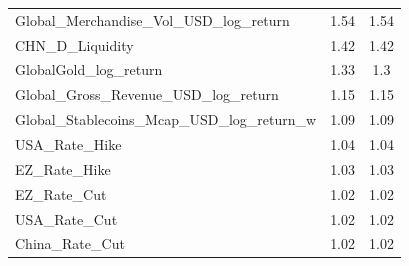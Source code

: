 \begin{table}[ht]
\begin{tabular}{lcc}
    Global\_Merchandise\_Vol\_USD\_log\_return & 1.54 & 1.54 \\ 
    CHN\_D\_Liquidity & 1.42 & 1.42 \\ 
    GlobalGold\_log\_return & 1.33 & 1.3 \\ 
    Global\_Gross\_Revenue\_USD\_log\_return & 1.15 & 1.15 \\ 
    Global\_Stablecoins\_Mcap\_USD\_log\_return\_w & 1.09 & 1.09 \\ 
    USA\_Rate\_Hike & 1.04 & 1.04 \\ 
    EZ\_Rate\_Hike & 1.03 & 1.03 \\ 
    EZ\_Rate\_Cut & 1.02 & 1.02 \\ 
    USA\_Rate\_Cut & 1.02 & 1.02 \\ 
    China\_Rate\_Cut & 1.02 & 1.02 \\ 
    \bottomrule
  \end{tabular}
\end{table}
